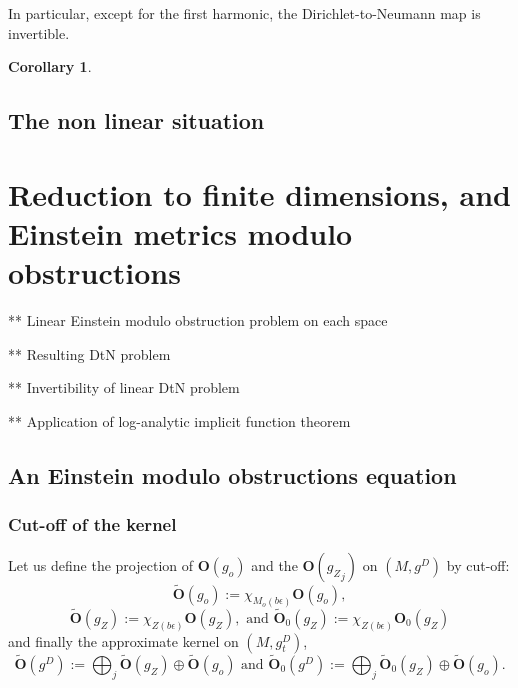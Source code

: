 \documentclass[12pt]{article}
\newtheorem{cor}[thm]{Corollary}
\begin{document}
    In particular, except for the first harmonic, the Dirichlet-to-Neumann map is invertible.
    \begin{cor}
    \end{cor}
    
\subsection{The non linear situation}


\section{Reduction to finite dimensions, and Einstein metrics modulo obstructions}

** Linear Einstein modulo obstruction problem on each space

** Resulting DtN problem

** Invertibility of linear DtN problem

** Application of log-analytic implicit function theorem

\subsection{An Einstein modulo obstructions equation}
 \subsubsection{Cut-off of the kernel}
 
 
 Let us define the projection of $\mathbf{O}(g_o)$ and the $\mathbf{O}({g_Z}_j)$ on $(M,g^D)$ by cut-off:
    \begin{equation}
        \tilde{\mathbf{O}}(g_o):=\chi_{M_o(b\epsilon)}\mathbf{O}(g_o),\label{tildOgo}
    \end{equation}
    \begin{equation}
        \tilde{\mathbf{O}}({g_Z}):=\chi_{Z(b\epsilon)}\mathbf{O}({g_Z}), \text{ and } \tilde{\mathbf{O}}_0({g_Z}):=\chi_{Z(b\epsilon)}\mathbf{O}_0({g_Z}) \label{tildOgb}
    \end{equation}
    and finally the approximate kernel on $(M,g^D_t)$,
    \begin{equation}
        \tilde{\mathbf{O}}(g^D):= \bigoplus_j\tilde{\mathbf{O}}({g_Z}) \oplus \tilde{\mathbf{O}}(g_o) \text{ and } \tilde{\mathbf{O}}_0(g^D):= \bigoplus_j\tilde{\mathbf{O}}_0({g_Z}) \oplus \tilde{\mathbf{O}}(g_o).\label{tildOgD}
    \end{equation}
    
\end{document}
